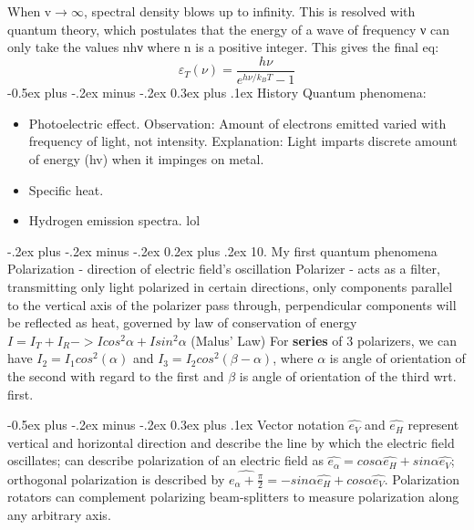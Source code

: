 \documentclass[a4paper,11pt,portrait]{article}
\makeatletter
\renewcommand{\section}{\@startsection{section}{1}{0mm}%
                            {-.2ex plus -.2ex minus -.2ex}%
                            {0.2ex plus .2ex}%
                            {\normalfont\tiny\bfseries}}
\renewcommand{\subsection}{\@startsection{subsection}{2}{0mm}%
                                {-0.5ex plus -.2ex minus -.2ex}%
                                {0.3ex plus .1ex}%
                                {\normalfont\footnotesize\bfseries}}
\makeatother
\begin{document}
\begin{multicols}{3}
\begin{itemize}
When v$\rightarrow\infty$, spectral density blows up to infinity. This is resolved with quantum theory, which postulates that the energy of a wave of frequency ν can only take the values nhν where n is a positive integer. This gives the final eq:
$$
\varepsilon_T(\nu) = \frac{h\nu}{e^{h\nu/k_B T} - 1}
$$
\subsection{History}
Quantum phenomena:
\begin{itemize}
    \item Photoelectric effect. Observation: Amount of electrons emitted varied with frequency of light, not intensity. Explanation: Light imparts discrete amount of energy (hv) when it impinges on metal.
    \item Specific heat.
    \item Hydrogen emission spectra. lol
\end{itemize}
\end{itemize}

\section{10. My first quantum phenomena}
Polarization - direction of electric field's oscillation
Polarizer - acts as a filter, transmitting only light polarized in certain directions, only components parallel to the vertical axis of the polarizer pass through, perpendicular components will be reflected as heat, governed by law of conservation of energy $I = I_T + I_R -> I cos^2 \alpha + I sin^2 \alpha$ (Malus' Law) For \textbf{series} of 3 polarizers, we can have $I_2= I_1 cos^2(\alpha)$ and $I_3 = I_2 cos^2(\beta - \alpha)$, where $\alpha$ is angle of orientation of the second with regard to the first and $\beta$ is angle of orientation of the third wrt. first.

\subsection{Vector notation}
$\hat{e_V}$ and $\hat{e_H}$ represent vertical and horizontal direction and describe the line by which the electric field oscillates; can describe polarization of an electric field as $\hat{e_\alpha} = cos \alpha \hat{e_H} + sin \alpha \hat{e_V}$; orthogonal polarization is described by $\hat{e_\alpha + \frac{\pi}{2}} = -sin \alpha \hat{e_H} + cos \alpha \hat{e_V}$. Polarization rotators can complement polarizing beam-splitters to measure polarization along any arbitrary axis.


\end{multicols}
\end{document}
